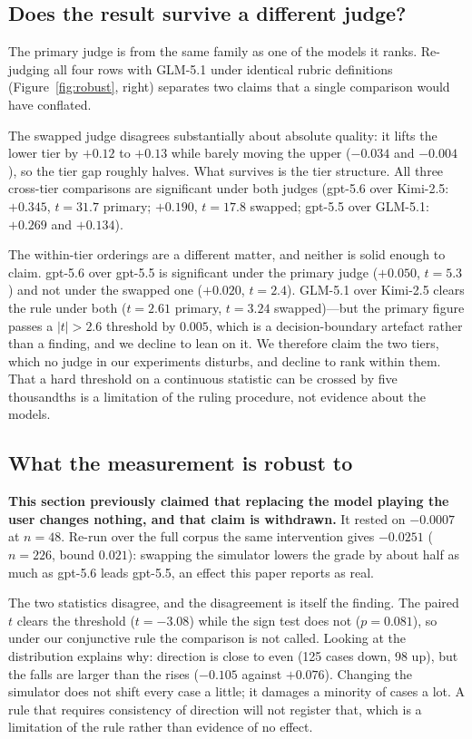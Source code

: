 \documentclass{article} %
\begin{document}
\subsection{Does the result survive a different judge?}
\label{sec:judgeswap}

The primary judge is from the same family as one of the models it ranks.
Re-judging all four rows with GLM-5.1 under identical rubric definitions
(Figure~\ref{fig:robust}, right) separates two claims that a single
comparison would have conflated.

The swapped judge disagrees substantially about absolute quality: it
lifts the lower tier by $+0.12$ to $+0.13$ while barely moving the upper
($-0.034$ and $-0.004$), so the tier gap roughly halves. What survives
is the tier structure. All three cross-tier comparisons are significant
under both judges (gpt-5.6 over Kimi-2.5: $+0.345$, $t = 31.7$ primary;
$+0.190$, $t = 17.8$ swapped; gpt-5.5 over GLM-5.1: $+0.269$ and
$+0.134$).

The within-tier orderings are a different matter, and neither is solid
enough to claim. gpt-5.6 over gpt-5.5 is significant under the primary
judge ($+0.050$, $t = 5.3$) and not under the swapped one ($+0.020$,
$t = 2.4$). GLM-5.1 over Kimi-2.5 clears the rule under both
($t = 2.61$ primary, $t = 3.24$ swapped)---but the primary figure passes
a $|t| > 2.6$ threshold by $0.005$, which is a decision-boundary
artefact rather than a finding, and we decline to lean on it. We
therefore claim the two tiers, which no judge in our experiments
disturbs, and decline to rank within them. That a hard threshold on a
continuous statistic can be crossed by five thousandths is a limitation
of the ruling procedure, not evidence about the models.

\subsection{What the measurement is robust to}

\textbf{This section previously claimed that replacing the model playing
the user changes nothing, and that claim is withdrawn.} It rested on
$-0.0007$ at $n=48$. Re-run over the full corpus the same intervention
gives $-0.0251$ ($n=226$, bound $0.021$): swapping the simulator lowers
the grade by about half as much as gpt-5.6 leads gpt-5.5, an effect this
paper reports as real.

The two statistics disagree, and the disagreement is itself the finding.
The paired $t$ clears the threshold ($t = -3.08$) while the sign test does
not ($p = 0.081$), so under our conjunctive rule the comparison is not
called. Looking at the distribution explains why: direction is close to
even (125 cases down, 98 up), but the falls are larger than the rises
($-0.105$ against $+0.076$). Changing the simulator does not shift every
case a little; it damages a minority of cases a lot. A rule that requires
consistency of direction will not register that, which is a limitation of
the rule rather than evidence of no effect.
\end{document}
